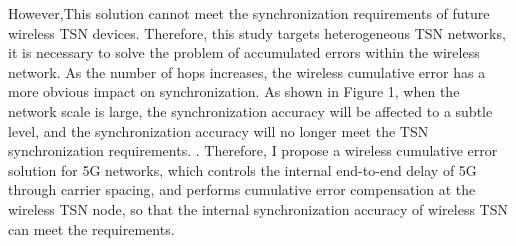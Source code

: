 \documentclass[conference]{IEEEtran}
\begin{document}
	However,This solution cannot meet the synchronization requirements of future wireless TSN devices. Therefore, this study targets heterogeneous TSN networks, it is necessary to solve the problem of accumulated errors within the wireless network.
	As the number of hops increases, the wireless cumulative error has a more obvious impact on synchronization. As shown in Figure 1, when the network scale is large, the synchronization accuracy will be affected to a subtle level, and the synchronization accuracy will no longer meet the TSN synchronization requirements. . Therefore, I propose a wireless cumulative error solution for 5G networks, which controls the internal end-to-end delay of 5G through carrier spacing, and performs cumulative error compensation at the wireless TSN node, so that the internal synchronization accuracy of wireless TSN can meet the requirements.
	
	
\end{document}
